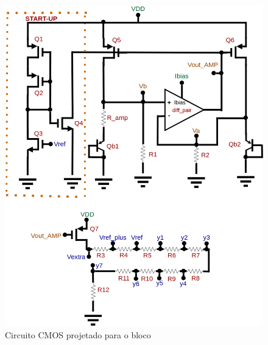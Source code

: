 \begin{figure}[htb]
 \label{\NomePFig}
 \centering
    \centering
    \caption{Circuito CMOS projetado para o bloco \NomeBloco} 
    \includegraphics[scale=0.3]{Circuitos/vref_generator.png}
\end{figure}

